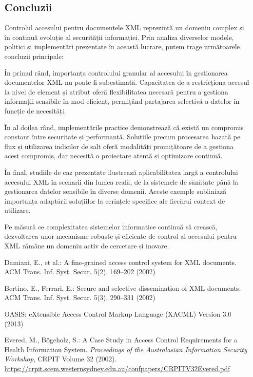 \documentclass[runningheads]{llncs}
\begin{document}
\begin{spacing}{1.5}
\section{Concluzii}
Controlul accesului pentru documentele XML reprezintă un domeniu complex și în continuă evoluție al securității informației. Prin analiza diverselor modele, politici și implementări prezentate în această lucrare, putem trage următoarele concluzii principale:

În primul rând, importanța controlului granular al accesului în gestionarea documentelor XML nu poate fi subestimată. Capacitatea de a restricționa accesul la nivel de element și atribut oferă flexibilitatea necesară pentru a gestiona informații sensibile în mod eficient, permițând partajarea selectivă a datelor în funcție de necesități.

În al doilea rând, implementările practice demonstrează că există un compromis constant între securitate și performanță. Soluțiile precum procesarea bazată pe flux și utilizarea indicilor de salt oferă modalități promițătoare de a gestiona acest compromis, dar necesită o proiectare atentă și optimizare continuă.

În final, studiile de caz prezentate ilustrează aplicabilitatea largă a controlului accesului XML în scenarii din lumea reală, de la sistemele de sănătate până la gestionarea datelor sensibile în diverse domenii. Aceste exemple subliniază importanța adaptării soluțiilor la cerințele specifice ale fiecărui context de utilizare.

Pe măsură ce complexitatea sistemelor informatice continuă să crească, dezvoltarea unor mecanisme robuste și eficiente de control al accesului pentru XML rămâne un domeniu activ de cercetare și inovare.


\begin{thebibliography}{9}

    Damiani, E., et al.: A fine-grained access control system for XML documents. ACM Trans. Inf. Syst. Secur. 5(2), 169--202 (2002)
    
    Bertino, E., Ferrari, E.: Secure and selective dissemination of XML documents. ACM Trans. Inf. Syst. Secur. 5(3), 290--331 (2002)
    
    OASIS: eXtensible Access Control Markup Language (XACML) Version 3.0 (2013)
    
    Evered, M., Bögeholz, S.: A Case Study in Access Control Requirements for a Health Information System. \textit{Proceedings of the Australasian Information Security Workshop}, CRPIT Volume 32 (2002). \url{https://crpit.scem.westernsydney.edu.au/confpapers/CRPITV32Evered.pdf}
    

\end{thebibliography}
\end{spacing}
\end{document}
